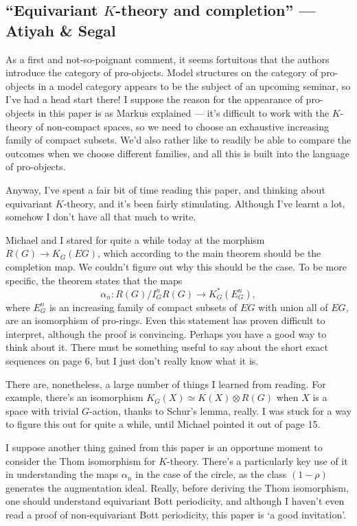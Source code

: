 \documentclass[11pt]{article}
\newcommand{\KanSemResponse}[1]
{
\thispagestyle{fancy}
\section{#1}
}
\begin{document}
\begin{AtiyahSegalEqKthy}
\KanSemResponse
{``Equivariant $K$-theory and completion'' --- Atiyah \& Segal}
As a first and not-so-poignant comment, it seems fortuitous that the authors introduce the category of pro-objects. Model structures on the category of pro-objects in a model category appears to be the subject of an upcoming seminar, so I've had a head start there! I suppose the reason for the appearance of pro-objects in this paper is as Markus explained --- it's difficult to work with the $K$-theory of non-compact spaces, so we need to choose an exhaustive increasing family of compact subsets. We'd also rather like to readily be able to compare the outcomes when we choose different families, and all this is built into the language of pro-objects.

Anyway, I've spent a fair bit of time reading this paper, and thinking about equivariant $K$-theory, and it's been fairly stimulating. Although I've learnt a lot, somehow I don't have all that much to write.

Michael and I stared for quite a while today at the morphism $R(G)\to K_G(EG)$, which according to the main theorem should be the completion map. We couldn't figure out why this should be the case. To be more specific, the theorem states that the maps
\[\alpha_n: R(G)/I_G^n R(G)\to K^*_G(E_G^n),\]
where $E_G^n$ is an increasing family of compact subsets of $EG$ with union all of $EG$, are an isomorphism of pro-rings. Even this statement has proven difficult to interpret, although the proof is convincing. Perhaps you have a good way to think about it. There must be something useful to say about the short exact sequences on page 6, but I just don't really know what it is.

There are, nonetheless, a large number of things I learned from reading. For example, there's an isomorphism $K_G(X)\simeq K(X)\otimes R(G)$ when $X$ is a space with trivial $G$-action, thanks to Schur's lemma, really. I was stuck for a way to figure this out for quite a while, until Michael pointed it out of page 15.

I suppose another thing gained from this paper is an opportune moment to consider the Thom isomorphism for $K$-theory. There's a particularly key use of it in understanding the maps $\alpha_n$ in the case of the circle, as the class $(1-\rho)$ generates the augmentation ideal. Really, before deriving the Thom isomorphism, one should understand equivariant Bott periodicity, and although I haven't even read a proof of non-equivariant Bott periodicity, this paper is `a good invitation'.


\end{AtiyahSegalEqKthy}
\end{document}
